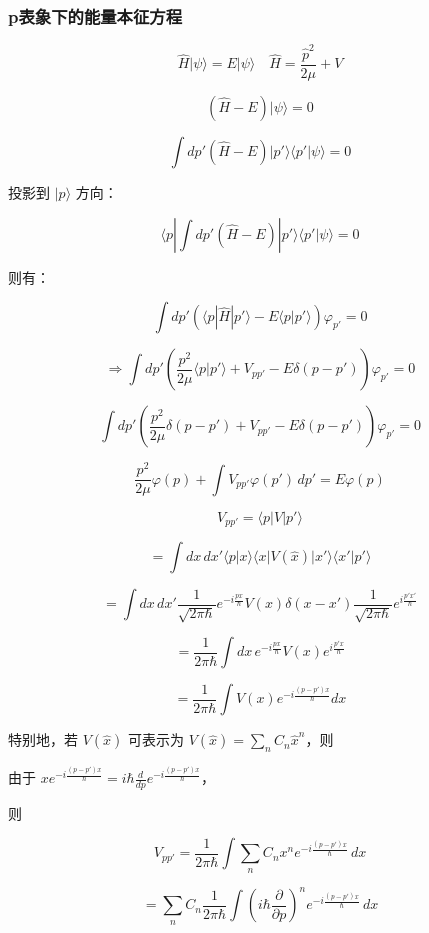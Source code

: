 \documentclass[lang=cn,10pt]{elegantbook}
\begin{document}
\subsubsection{p表象下的能量本征方程}

\[
\hat{H} | \psi \rangle = E | \psi \rangle \quad \hat{H} = \frac{\hat{p}^2}{2\mu} + V
\]

\[
(\hat{H} - E) | \psi \rangle = 0
\]

\[
	\int dp'  (\hat{H} - E) | p' \rangle \langle p' | \psi \rangle = 0
\]

投影到 $| p \rangle$ 方向：

\[
	\langle p | \int dp' (\hat{H} - E) | p' \rangle \langle p' | \psi \rangle = 0
\]

则有：

\[
	\int dp' \left( \langle p | \hat{H} | p' \rangle - E \langle p | p' \rangle \right) \varphi_{p'} = 0
\]

\[
	\Rightarrow \int dp' \left( \frac{p^2}{2\mu} \langle p | p' \rangle + V_{pp'} - E \delta(p - p') \right) \varphi_{p'} = 0
\]

\[
	\int dp' \left( \frac{p^2}{2\mu} \delta(p - p') + V_{pp'} - E \delta(p - p') \right) \varphi_{p'} = 0
\]

\[
\frac{p^2}{2\mu}\varphi(p)  + \int V_{pp'} \varphi(p') \, dp' = E \varphi(p)
\]


\[
	V_{pp'} = \langle p | V | p' \rangle
\]

\[
	= \int dx \, dx' \langle p | x \rangle \langle x | V(\hat{x}) | x' \rangle \langle x' | p' \rangle
\]

\[
	= \int dx \, dx' \frac{1}{\sqrt{2\pi \hbar}} e^{-i \frac{p x}{\hbar}} V(x) \delta(x-x') \frac{1}{\sqrt{2\pi \hbar}} e^{i \frac{p' x'}{\hbar}}
\]

\[
	= \frac{1}{2\pi \hbar} \int dx \, e^{-i \frac{p x}{\hbar}} V(x)  e^{i \frac{p' x}{\hbar}}
\]

\[
	= \frac{1}{2\pi \hbar} \int V(x) e^{-i \frac{(p-p') x}{\hbar}} dx
\]

特别地，若 $V(\hat{x})$ 可表示为 $V(\hat{x}) = \sum_n C_n \hat{x}^n$，则

	由于 $x e^{-i \frac{(p-p')x}{\hbar}} = i \hbar \frac{d}{dp} e^{-i \frac{(p-p')x}{\hbar}}$，

则 

\[
	V_{pp'} = \frac{1}{2\pi\hbar}\int \sum_n C_n x^n e^{-i \frac{(p-p')x}{\hbar}} \, dx
\]

\[
	= \sum_n C_n \frac{1}{2\pi \hbar} \int (i \hbar \frac{\partial}{\partial p})^n e^{-i \frac{(p - p')x}{\hbar}} \, dx
\]
\end{document}
